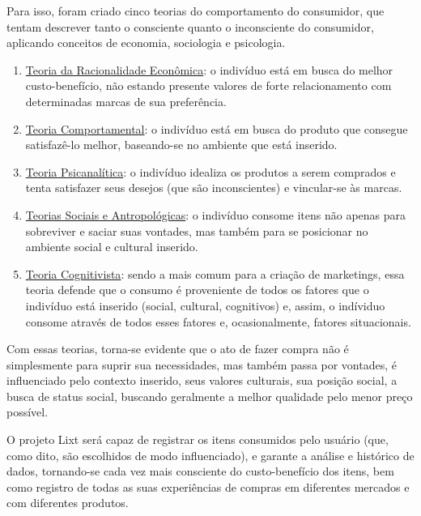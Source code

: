 Para isso, foram criado cinco teorias do comportamento do consumidor, que tentam descrever tanto o consciente quanto o inconsciente do consumidor, aplicando conceitos de economia, sociologia e psicologia. \cite{TeoriasConsumidor}

\begin{enumerate}

	\item \underline{Teoria da Racionalidade Econômica}: o indivíduo está em busca do melhor custo-benefício, não estando presente valores de forte relacionamento com determinadas marcas de sua preferência.

	\item \underline{Teoria Comportamental}: o indivíduo está em busca do produto que consegue satisfazê-lo melhor, baseando-se no ambiente que está inserido.

	\item \underline{Teoria Psicanalítica}: o indivíduo idealiza os produtos a serem comprados e tenta satisfazer seus desejos (que são inconscientes) e vincular-se às marcas.

	\item \underline{Teorias Sociais e Antropológicas}: o indivíduo consome itens não apenas para sobreviver e saciar suas vontades, mas também para se posicionar no ambiente social e cultural inserido.

	\item \underline{Teoria Cognitivista}: sendo a mais comum para a criação de marketings, essa teoria defende que o consumo é proveniente de todos os fatores que o indivíduo está inserido (social, cultural, cognitivos) e, assim, o indíviduo consome através de todos esses fatores e, ocasionalmente, fatores situacionais.
	
\end{enumerate}

Com essas teorias, torna-se evidente que o ato de fazer compra não é simplesmente para suprir sua necessidades, mas também passa por vontades, é influenciado pelo contexto inserido, seus valores culturais, sua posição social, a busca de status social, buscando geralmente a melhor qualidade pelo menor preço possível.

O projeto Lixt será capaz de registrar os itens consumidos pelo usuário (que, como dito, são escolhidos de modo influenciado), e garante a análise e histórico de dados, tornando-se cada vez mais consciente do custo-benefício dos itens, bem como registro de todas as suas experiências de compras em diferentes mercados e com diferentes produtos.

